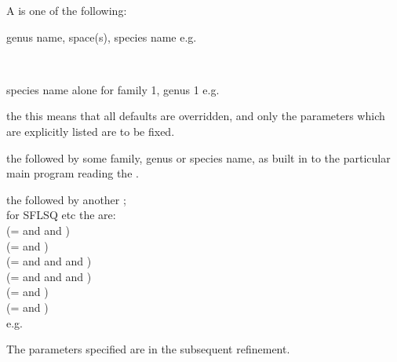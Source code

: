 \begin{varindent}{1cm}A  is one of the following:
\begin{list} {} {\setlength{\labelwidth}{ 8 cm}
  \setlength{\parsep}{-1ex}
  \setlength{\leftmargin}{\labelwidth}}
\item[genus name, space(s), species name e.g. \hfill] 
\item[\  \hfill] \ssk
\item[species name alone for family 1, genus 1 e.g. \hfill]  
\end{list}
\begin{list}{}{\setlength{\labelwidth}{ 4.5 cm}
  \setlength{\parsep}{-1ex}
  \setlength{\leftmargin}{\labelwidth}}
\item[the \cw \bd{ONLY} \hfill] this means that all defaults are
                             overridden, and only the parameters which
                             are explicitly listed are to be fixed.
\item[the \cw \bd{ALL} \hfill] followed by some family, genus or species
                             name, as built in to the particular main
                             program reading the .\\
\item[the \cw \bd{ALL} \hfill] followed by another \cwcomma;\\
 for SFLSQ etc the \cws are:\\
    (=  and  and )\\
    (=  and )\\
   (=  and  and  and )\\
   (=  and  and  and )\\
   (=  and )\\
   (=  and )\\
e.g. \\
\end{list}
The parameters specified are  in the
           subsequent refinement.
\end{varindent}
\p
{} 
 
